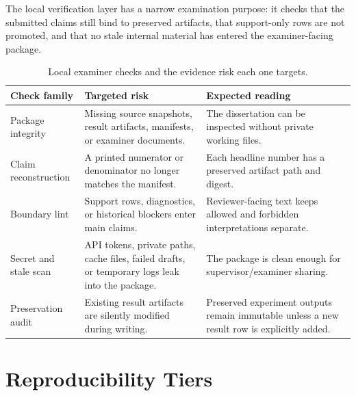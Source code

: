 The local verification layer has a narrow examination purpose: it checks that the submitted claims still bind to preserved artifacts, that support-only rows are not promoted, and that no stale internal material has entered the examiner-facing package.

\begin{table}[htbp]
\centering
\caption{Local examiner checks and the evidence risk each one targets.}
\label{tab:local-examiner-checks}
\tighttable
\begin{tabularx}{\textwidth}{@{}L{2.35cm}YY@{}}
\toprule
Check family & Targeted risk & Expected reading \\
\midrule
Package integrity & Missing source snapshots, result artifacts, manifests, or examiner documents. & The dissertation can be inspected without private working files. \\
Claim reconstruction & A printed numerator or denominator no longer matches the manifest. & Each headline number has a preserved artifact path and digest. \\
Boundary lint & Support rows, diagnostics, or historical blockers enter main claims. & Reviewer-facing text keeps allowed and forbidden interpretations separate. \\
Secret and stale scan & API tokens, private paths, cache files, failed drafts, or temporary logs leak into the package. & The package is clean enough for supervisor/examiner sharing. \\
Preservation audit & Existing result artifacts are silently modified during writing. & Preserved experiment outputs remain immutable unless a new result row is explicitly added. \\
\bottomrule
\end{tabularx}
\end{table}
\FloatBarrier

\section{Reproducibility Tiers}

